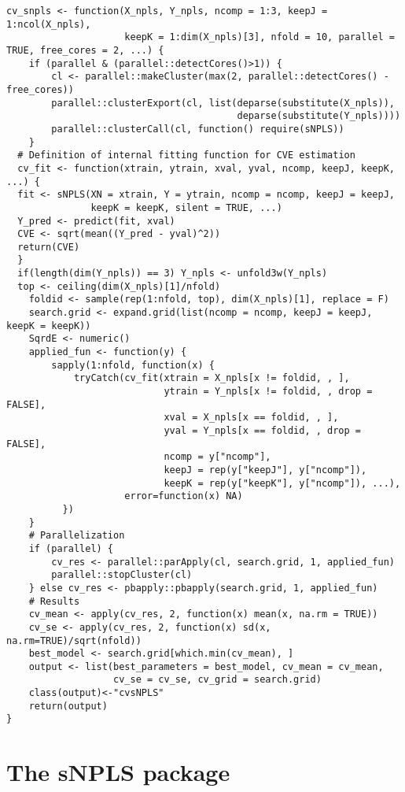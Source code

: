 \begin{scriptsize}
\begin{verbatim}
cv_snpls <- function(X_npls, Y_npls, ncomp = 1:3, keepJ = 1:ncol(X_npls),
                     keepK = 1:dim(X_npls)[3], nfold = 10, parallel = TRUE, free_cores = 2, ...) {
    if (parallel & (parallel::detectCores()>1)) {
        cl <- parallel::makeCluster(max(2, parallel::detectCores() - free_cores))
        parallel::clusterExport(cl, list(deparse(substitute(X_npls)),
                                         deparse(substitute(Y_npls))))
        parallel::clusterCall(cl, function() require(sNPLS))
    }
  # Definition of internal fitting function for CVE estimation
  cv_fit <- function(xtrain, ytrain, xval, yval, ncomp, keepJ, keepK, ...) {
  fit <- sNPLS(XN = xtrain, Y = ytrain, ncomp = ncomp, keepJ = keepJ,
               keepK = keepK, silent = TRUE, ...)
  Y_pred <- predict(fit, xval)
  CVE <- sqrt(mean((Y_pred - yval)^2))
  return(CVE)
  }
  if(length(dim(Y_npls)) == 3) Y_npls <- unfold3w(Y_npls)
  top <- ceiling(dim(X_npls)[1]/nfold)
    foldid <- sample(rep(1:nfold, top), dim(X_npls)[1], replace = F)
    search.grid <- expand.grid(list(ncomp = ncomp, keepJ = keepJ, keepK = keepK))
    SqrdE <- numeric()
    applied_fun <- function(y) {
        sapply(1:nfold, function(x) {
            tryCatch(cv_fit(xtrain = X_npls[x != foldid, , ],
                            ytrain = Y_npls[x != foldid, , drop = FALSE],
                            xval = X_npls[x == foldid, , ],
                            yval = Y_npls[x == foldid, , drop = FALSE],
                            ncomp = y["ncomp"],
                            keepJ = rep(y["keepJ"], y["ncomp"]),
                            keepK = rep(y["keepK"], y["ncomp"]), ...),
                     error=function(x) NA)
          })
    }
    # Parallelization
    if (parallel) {
        cv_res <- parallel::parApply(cl, search.grid, 1, applied_fun)
        parallel::stopCluster(cl)
    } else cv_res <- pbapply::pbapply(search.grid, 1, applied_fun)
    # Results
    cv_mean <- apply(cv_res, 2, function(x) mean(x, na.rm = TRUE))
    cv_se <- apply(cv_res, 2, function(x) sd(x, na.rm=TRUE)/sqrt(nfold))
    best_model <- search.grid[which.min(cv_mean), ]
    output <- list(best_parameters = best_model, cv_mean = cv_mean,
                   cv_se = cv_se, cv_grid = search.grid)
    class(output)<-"cvsNPLS"
    return(output)
}
\end{verbatim}
\end{scriptsize}

\section{The sNPLS package}
